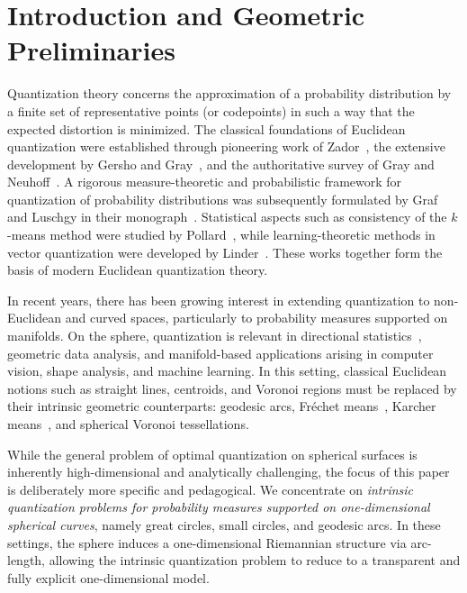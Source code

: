 \documentclass[12pt, reqno]{amsart}
\theoremstyle{plain}
\theoremstyle{definition}
\begin{document}
 
\setcounter{tocdepth}{2}
\tableofcontents
 


\section{Introduction and Geometric Preliminaries}

Quantization theory concerns the approximation of a probability distribution by a finite set of
representative points (or codepoints) in such a way that the expected distortion is minimized. The
classical foundations of Euclidean quantization were established through pioneering work of
Zador~\cite{Zador1982}, the extensive development by Gersho and Gray~\cite{GershoGray1992}, and the
authoritative survey of Gray and Neuhoff~\cite{GrayNeuhoff1998}. A rigorous measure-theoretic and
probabilistic framework for quantization of probability distributions was subsequently formulated by Graf
and Luschgy in their monograph~\cite{GrafLuschgy2000}. Statistical aspects such as consistency of the
$k$-means method were studied by Pollard~\cite{Pollard1982}, while learning-theoretic methods in vector
quantization were developed by Linder~\cite{Linder2002}. These works together form the basis of modern
Euclidean quantization theory.



In recent years, there has been growing interest in extending quantization to non-Euclidean and curved
spaces, particularly to probability measures supported on manifolds. On the sphere, quantization is
relevant in directional statistics~\cite{MardiaJupp2000}, geometric data analysis, and manifold-based
applications arising in computer vision, shape analysis, and machine learning. In this setting, classical
Euclidean notions such as straight lines, centroids, and Voronoi regions must be replaced by their intrinsic
geometric counterparts: geodesic arcs, Fréchet means~\cite{Frechet1948}, Karcher means~\cite{Karcher1977},
and spherical Voronoi tessellations.

 
While the general problem of optimal quantization on spherical surfaces is inherently
high-dimensional and analytically challenging, the focus of this paper is deliberately
more specific and pedagogical. We concentrate on \emph{intrinsic quantization problems
for probability measures supported on one-dimensional spherical curves}, namely great
circles, small circles, and geodesic arcs. In these settings, the sphere induces a
one-dimensional Riemannian structure via arc-length, allowing the intrinsic quantization
problem to reduce to a transparent and fully explicit one-dimensional model.
\end{document}
